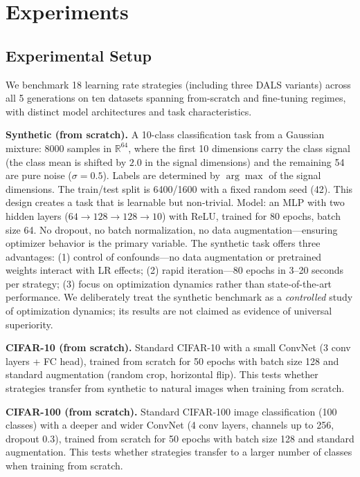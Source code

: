 \documentclass[a4paper,fleqn]{cas-dc}
\begin{document}
\section{Experiments}\label{sec:experiments}

\subsection{Experimental Setup}

We benchmark 18 learning rate strategies (including three DALS variants) across all 5 generations on ten datasets spanning from-scratch and fine-tuning regimes, with distinct model architectures and task characteristics.

\textbf{Synthetic (from scratch).} A 10-class classification task from a Gaussian mixture: 8000 samples in $\mathbb{R}^{64}$, where the first 10 dimensions carry the class signal (the class mean is shifted by $2.0$ in the signal dimensions) and the remaining 54 are pure noise ($\sigma = 0.5$). Labels are determined by $\arg\max$ of the signal dimensions. The train/test split is 6400/1600 with a fixed random seed (42). This design creates a task that is learnable but non-trivial. Model: an MLP with two hidden layers ($64\to128\to128\to10$) with ReLU, trained for 80 epochs, batch size 64. No dropout, no batch normalization, no data augmentation---ensuring optimizer behavior is the primary variable. The synthetic task offers three advantages: (1) control of confounds---no data augmentation or pretrained weights interact with LR effects; (2) rapid iteration---80 epochs in 3--20 seconds per strategy; (3) focus on optimization dynamics rather than state-of-the-art performance. We deliberately treat the synthetic benchmark as a \emph{controlled} study of optimization dynamics; its results are not claimed as evidence of universal superiority.

\textbf{CIFAR-10 (from scratch).} Standard CIFAR-10 with a small ConvNet (3 conv layers + FC head), trained from scratch for 50 epochs with batch size 128 and standard augmentation (random crop, horizontal flip). This tests whether strategies transfer from synthetic to natural images when training from scratch.

\textbf{CIFAR-100 (from scratch).} Standard CIFAR-100 image classification (100 classes) with a deeper and wider ConvNet (4 conv layers, channels up to 256, dropout 0.3), trained from scratch for 50 epochs with batch size 128 and standard augmentation. This tests whether strategies transfer to a larger number of classes when training from scratch.
\end{document}
